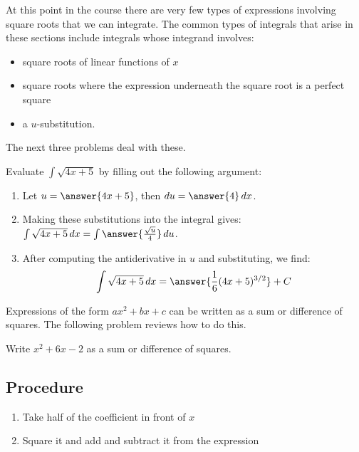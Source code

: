 \documentclass{ximera}
\author{}
\begin{document}
\begin{exercise}

  At this point in the course there are very few types of expressions involving square roots that we can integrate.  The common types of integrals that arise in these sections include integrals whose integrand involves:
  \begin{itemize}
    \item
      square roots of linear functions of $x$
      
    \item
      square roots where the expression underneath the square root is a perfect square
    
    \item
      a $u$-substitution.
  \end{itemize}
  
  The next three problems deal with these.
  

\begin{problem}
  Evaluate $\int \sqrt{4x + 5}$ by filling out the following argument:
  \begin{enumerate}
    \item Let $u = \answer{4x + 5}$, then $\d u = \answer{4} \d x$.
    \item Making these substitutions into the integral gives: $\int \sqrt{4x + 5} \d x = \int \answer{\frac{\sqrt{u}}{4}} \d u$.
    \item After computing the antiderivative in $u$ and substituting, we find:
    \[
      \int \sqrt{4x + 5} \d x = \answer{\frac{1}{6}(4x+5)^{3/2}} + C
    \]
  \end{enumerate}
\end{problem}

\begin{problem}
  Expressions of the form $ax^2 + bx + c$ can be written as a sum or difference of squares.
  The following problem reviews how to do this.
  
  Write $x^2 + 6x - 2$ as a sum or difference of squares.
  
  \subsection{Procedure}
  \begin{enumerate}
    \item Take half of the coefficient in front of $x$
    \item Square it and add and subtract it from the expression


\end{enumerate}
\end{problem}
\end{exercise}
\end{document}

